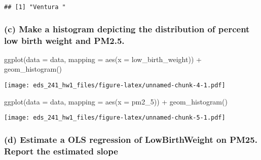 \documentclass[
]{article}
\newenvironment{Shaded}{\begin{snugshade}}{\end{snugshade}}
\newcommand{\AttributeTok}[1]{\textcolor[rgb]{0.77,0.63,0.00}{#1}}
\newcommand{\FunctionTok}[1]{\textcolor[rgb]{0.00,0.00,0.00}{#1}}
\newcommand{\NormalTok}[1]{#1}
\newcommand{\OtherTok}[1]{\textcolor[rgb]{0.56,0.35,0.01}{#1}}
\newcommand{\SpecialCharTok}[1]{\textcolor[rgb]{0.00,0.00,0.00}{#1}}
\begin{document}
\begin{Shaded}
\end{Shaded}

\begin{verbatim}
## [1] "Ventura "
\end{verbatim}

\hypertarget{c-make-a-histogram-depicting-the-distribution-of-percent-low-birth-weight-and-pm2.5.}{%
\subsubsection{(c) Make a histogram depicting the distribution of
percent low birth weight and
PM2.5.}\label{c-make-a-histogram-depicting-the-distribution-of-percent-low-birth-weight-and-pm2.5.}}

\begin{Shaded}
\begin{Highlighting}[]
\FunctionTok{ggplot}\NormalTok{(}\AttributeTok{data =}\NormalTok{ data, }\AttributeTok{mapping =} \FunctionTok{aes}\NormalTok{(}\AttributeTok{x =}\NormalTok{ low\_birth\_weight)) }\SpecialCharTok{+}
  \FunctionTok{geom\_histogram}\NormalTok{()}
\end{Highlighting}
\end{Shaded}

\texttt{[image: eds\_241\_hw1\_files/figure-latex/unnamed-chunk-4-1.pdf]}

\begin{Shaded}
\begin{Highlighting}[]
\FunctionTok{ggplot}\NormalTok{(}\AttributeTok{data =}\NormalTok{ data, }\AttributeTok{mapping =} \FunctionTok{aes}\NormalTok{(}\AttributeTok{x =}\NormalTok{ pm2\_5)) }\SpecialCharTok{+}
  \FunctionTok{geom\_histogram}\NormalTok{()}
\end{Highlighting}
\end{Shaded}

\texttt{[image: eds\_241\_hw1\_files/figure-latex/unnamed-chunk-5-1.pdf]}

\hypertarget{d-estimate-a-ols-regression-of-lowbirthweight-on-pm25.-report-the-estimated-slope}{%
\subsubsection{(d) Estimate a OLS regression of LowBirthWeight on PM25.
Report the estimated
slope}\label{d-estimate-a-ols-regression-of-lowbirthweight-on-pm25.-report-the-estimated-slope}}
\end{document}
